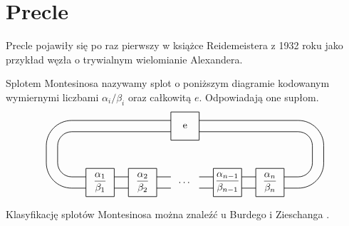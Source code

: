 \section{Precle} %
Precle pojawiły się po raz pierwszy w książce Reidemeistera z 1932 roku jako przykład węzła o trywialnym wielomianie Alexandera.

\label{sec:pretzel}
\begin{definition}
	Splotem Montesinosa nazywamy splot o poniższym diagramie
	kodowanym wymiernymi liczbami $\alpha_i/\beta_i$ oraz całkowitą $e$.
	Odpowiadają one supłom.
	\[
	\begin{tikzpicture}[baseline=-0.65ex, scale=0.1]
		\draw[semithick] (-5, 5) rectangle (5, 15);
		\foreach \x in {0,1,3,4} {
			\draw[semithick] (15*\x-35, -15) rectangle (15*\x-25, -5);
		}
		\foreach \x in {0,1,2,3,4,5} {
			\draw[semithick] (15*\x-35, -8) to (15*\x-40, -8);
			\draw[semithick] (15*\x-35, -12) to (15*\x-40, -12);
		}
		\draw[semithick] (-40, -8) [in=down, out=left] to (-45, -3);
		\draw[semithick] (-40, -12) [in=down, out=left] to (-49, -3);

		\draw[semithick] (-40, 8) [in=up, out=left] to (-45, 3);
		\draw[semithick] (-40, 12) [in=up, out=left] to (-49, 3);

		\draw[semithick] (40, 8) [in=up, out=right] to (45, 3);
		\draw[semithick] (40, 12) [in=up, out=right] to (49, 3);

		\draw[semithick] (40, -8) [in=down, out=right] to (45, -3);
		\draw[semithick] (40, -12) [in=down, out=right] to (49, -3);

		\draw[semithick] (-45, -3)  to (-45, 3);
		\draw[semithick] (-49, -3)  to (-49, 3);
		\draw[semithick] (45, -3)  to (45, 3);
		\draw[semithick] (49, -3)  to (49, 3);

		\draw[semithick] (-5, 8)  to (-40, 8);
		\draw[semithick] ( 5, 8)  to ( 40, 8);
		\draw[semithick] (-5, 12)  to (-40, 12);
		\draw[semithick] ( 5, 12)  to ( 40, 12);

		\node at (0, 10) {e};
		\node at (0, -10) {\ldots};
		\node at (-15, -10) {$\displaystyle \frac{\alpha_2}{\beta_2}$};
		\node at (-30, -10) {$\displaystyle \frac{\alpha_1}{\beta_1}$};
		\node at (15, -10) {$\displaystyle \frac{\alpha_{n-1}}{\beta_{n-1}}$};
		\node at (30, -10) {$\displaystyle \frac{\alpha_n}{\beta_n}$};
	\end{tikzpicture}
	\]
\end{definition}

Klasyfikację splotów Montesinosa można znaleźć u Burdego i Zieschanga \cite{burde85}.

